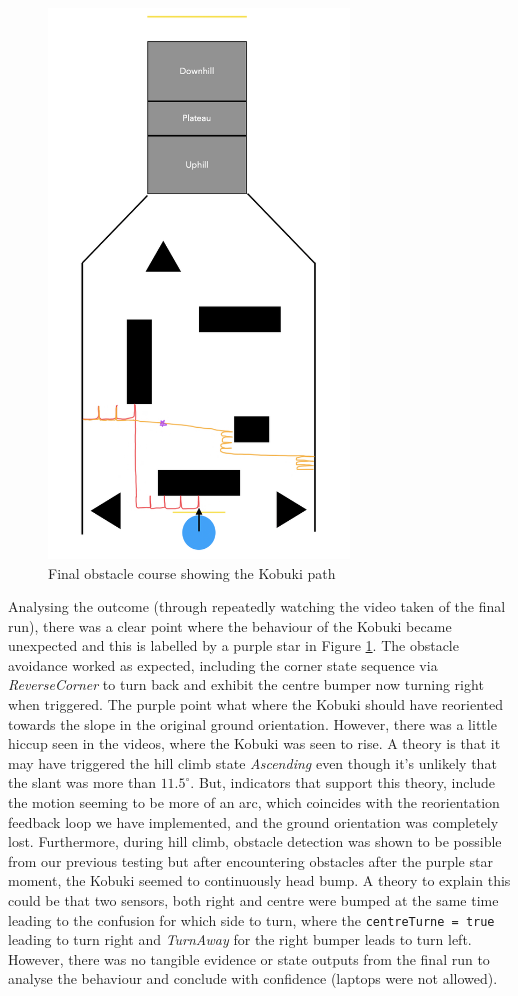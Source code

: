 \begin{figure}[H]
    \centering
    \includegraphics[width=8cm]{Images/KobukiFinalPath.png}
    \caption{Final obstacle course showing the Kobuki path}
    \label{fig:KobukiFinalPath}
\end{figure}

Analysing the outcome (through repeatedly watching the video taken of the final run), there was a clear point where the behaviour of the Kobuki became unexpected and this is labelled by a purple star in Figure \ref{fig:KobukiFinalPath}. The obstacle avoidance worked as expected, including the corner state sequence via \textit{ReverseCorner} to turn back and exhibit the centre bumper now turning right when triggered. The purple point what where the Kobuki should have reoriented towards the slope in the original ground orientation. However, there was a little hiccup seen in the videos, where the Kobuki was seen to rise. A theory is that it may have triggered the hill climb state \textit{Ascending} even though it's unlikely that the slant was more than $11.5^\circ$. But, indicators that support this theory, include the motion seeming to be more of an arc, which coincides with the reorientation feedback loop we have implemented, and the ground orientation was completely lost. Furthermore, during hill climb, obstacle detection was shown to be possible from our previous testing but after encountering obstacles after the purple star moment, the Kobuki seemed to continuously head bump. A theory to explain this could be that two sensors, both right and centre were bumped at the same time leading to the confusion for which side to turn, where the \texttt{centreTurne = true} leading to turn right and \textit{TurnAway} for the right bumper leads to turn left. However, there was no tangible evidence or state outputs from the final run to analyse the behaviour and conclude with confidence (laptops were not allowed).

